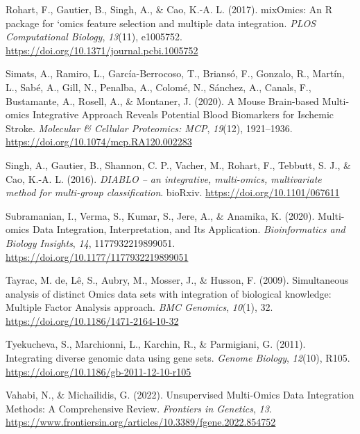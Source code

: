 \documentclass[a4paper, nobind]{templates/ociamthesis}
\newlength{\cslhangindent}
\newenvironment{CSLReferences}[2] %
 {%
  \setlength{\parindent}{0pt}
  \ifodd #1
  \let\oldpar\par
  \def\par{\hangindent=\cslhangindent\oldpar}
  \fi
  \setlength{\parskip}{1mm}
  \setlength{\baselineskip}{6mm}
 }%
 {}
\begin{document}
\begin{CSLReferences}{1}{0}
\leavevmode{}%
Rohart, F., Gautier, B., Singh, A., \& Cao, K.-A. L. (2017). {mixOmics}: {An} {R} package for `omics feature selection and multiple data integration. \emph{PLOS Computational Biology}, \emph{13}(11), e1005752. \url{https://doi.org/10.1371/journal.pcbi.1005752}

\leavevmode{}%
Simats, A., Ramiro, L., García-Berrocoso, T., Briansó, F., Gonzalo, R., Martín, L., Sabé, A., Gill, N., Penalba, A., Colomé, N., Sánchez, A., Canals, F., Bustamante, A., Rosell, A., \& Montaner, J. (2020). A {Mouse} {Brain}-based {Multi}-omics {Integrative} {Approach} {Reveals} {Potential} {Blood} {Biomarkers} for {Ischemic} {Stroke}. \emph{Molecular \& Cellular Proteomics: MCP}, \emph{19}(12), 1921--1936. \url{https://doi.org/10.1074/mcp.RA120.002283}

\leavevmode{}%
Singh, A., Gautier, B., Shannon, C. P., Vacher, M., Rohart, F., Tebbutt, S. J., \& Cao, K.-A. L. (2016). \emph{{DIABLO} -- an integrative, multi-omics, multivariate method for multi-group classification}. bioRxiv. \url{https://doi.org/10.1101/067611}

\leavevmode{}%
Subramanian, I., Verma, S., Kumar, S., Jere, A., \& Anamika, K. (2020). Multi-omics {Data} {Integration}, {Interpretation}, and {Its} {Application}. \emph{Bioinformatics and Biology Insights}, \emph{14}, 1177932219899051. \url{https://doi.org/10.1177/1177932219899051}

\leavevmode{}%
Tayrac, M. de, Lê, S., Aubry, M., Mosser, J., \& Husson, F. (2009). Simultaneous analysis of distinct {Omics} data sets with integration of biological knowledge: {Multiple} {Factor} {Analysis} approach. \emph{BMC Genomics}, \emph{10}(1), 32. \url{https://doi.org/10.1186/1471-2164-10-32}

\leavevmode{}%
Tyekucheva, S., Marchionni, L., Karchin, R., \& Parmigiani, G. (2011). Integrating diverse genomic data using gene sets. \emph{Genome Biology}, \emph{12}(10), R105. \url{https://doi.org/10.1186/gb-2011-12-10-r105}

\leavevmode{}%
Vahabi, N., \& Michailidis, G. (2022). Unsupervised {Multi}-{Omics} {Data} {Integration} {Methods}: {A} {Comprehensive} {Review}. \emph{Frontiers in Genetics}, \emph{13}. \url{https://www.frontiersin.org/articles/10.3389/fgene.2022.854752}


\end{CSLReferences}
\end{document}
